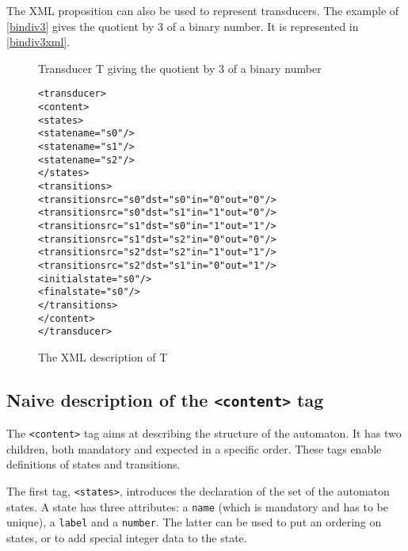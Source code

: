 \documentclass[a4paper]{article}
\newcommand{\xtag}[1]{\texttt{<#1>}}
\newcommand{\xattr}[1]{\texttt{#1}}
\begin{document}
The XML proposition can also be used to represent transducers. The example of
\autoref{bindiv3} gives the quotient by 3 of a binary number. It is
represented in \autoref{bindiv3xml}.


\begin{figure}[ht]
  \begin{center}
\caption{Transducer T giving the quotient by 3 of a binary number}
\label{bindiv3}
  \end{center}
\end{figure}

\small
\begin{figure}[ht]
  \begin{center}
\begin{alltt}
<transducer>
  <content>
    <states>
       <state name="s0"/>
       <state name="s1"/>
       <state name="s2"/>
    </states>
    <transitions>
       <transition src="s0" dst="s0" in="0" out="0"/>
       <transition src="s0" dst="s1" in="1" out="0"/>
       <transition src="s1" dst="s0" in="1" out="1"/>
       <transition src="s1" dst="s2" in="0" out="0"/>
       <transition src="s2" dst="s2" in="1" out="1"/>
       <transition src="s2" dst="s1" in="0" out="1"/>
       <initial state="s0"/>
       <final state="s0"/>
    </transitions>
  </content>
</transducer>
\end{alltt}

\caption{The XML description of T}
\label{bindiv3xml}
  \end{center}
\end{figure}

\newpage
\subsection{Naive description of the \xtag{content} tag}

The \xtag{content} tag aims at describing the structure of the
automaton. It has two children, both mandatory and expected
in a specific order. These tags enable definitions of states
and transitions.

The first tag, \xtag{states}, introduces the declaration of
the set of the automaton states. A state has three attributes: a
\xattr{name} (which is mandatory and has to be unique), a \xattr{label}
and a \xattr{number}. The latter can be used to put an ordering on states,
or to add special integer data to the state.
\end{document}

